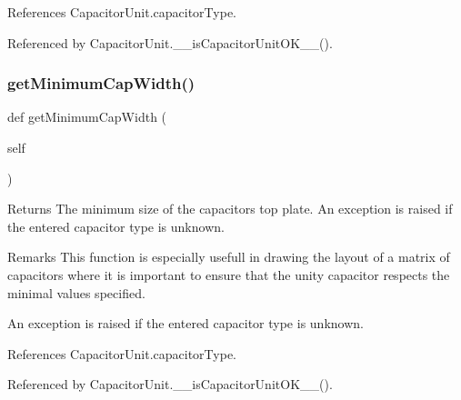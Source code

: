 References Capacitor\+Unit.\+capacitor\+Type.



Referenced by Capacitor\+Unit.\+\_\+\+\_\+is\+Capacitor\+Unit\+O\+K\+\_\+\+\_\+().

\mbox{\label{classpython_1_1capacitorunit_1_1CapacitorUnit_ad2f46584dd8249360127259f6c563921}} 
\subsubsection{\texorpdfstring{get\+Minimum\+Cap\+Width()}{getMinimumCapWidth()}}
{\footnotesize\ttfamily def get\+Minimum\+Cap\+Width (\begin{DoxyParamCaption}\item[{}]{self }\end{DoxyParamCaption})}

\begin{DoxyReturn}{Returns}
The minimum size of the capacitor\textquotesingle{}s top plate. An exception is raised if the entered capacitor type is unknown. 
\end{DoxyReturn}
\begin{DoxyRemark}{Remarks}
This function is especially usefull in drawing the layout of a matrix of capacitors where it is important to ensure that the unity capacitor respects the minimal values specified. 

An exception is raised if the entered capacitor type is unknown. 
\end{DoxyRemark}


References Capacitor\+Unit.\+capacitor\+Type.



Referenced by Capacitor\+Unit.\+\_\+\+\_\+is\+Capacitor\+Unit\+O\+K\+\_\+\+\_\+().

\mbox{\label{classpython_1_1capacitorunit_1_1CapacitorUnit_a2f1c438575964c1db979c40b9db805c7}} 
